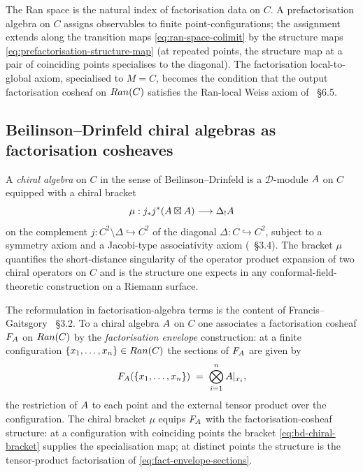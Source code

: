 The Ran space is the natural index of factorisation data on $C$. A
prefactorisation algebra on $C$ assigns observables to finite
point-configurations; the assignment extends along the transition maps
\eqref{eq:ran-space-colimit} by the structure maps
\eqref{eq:prefactorisation-structure-map} (at repeated points, the
structure map at a pair of coinciding points specialises to the
diagonal). The factorisation local-to-global axiom, specialised to
$M = C$, becomes the condition that the output factorisation cosheaf
on $Ran(C)$ satisfies the Ran-local Weiss axiom of
\cite{CostelloGwilliam2017}~\S6.5.

\subsection{Beilinson--Drinfeld chiral algebras as factorisation cosheaves}

A \emph{chiral algebra} on $C$ in the sense of Beilinson--Drinfeld
\cite{BeilinsonDrinfeld} is a $\mathcal{D}$-module $A$ on $C$
equipped with a chiral bracket
\begin{equation}
\label{eq:bd-chiral-bracket}
  \mu : j_* j^{*} (A \boxtimes A) \longrightarrow
  \Delta_{!} A
\end{equation}
on the complement $j \colon C^2 \setminus \Delta \hookrightarrow C^2$
of the diagonal $\Delta \colon C \hookrightarrow C^2$, subject to a
symmetry axiom and a Jacobi-type associativity axiom
(\cite{BeilinsonDrinfeld}~\S3.4). The bracket $\mu$ quantifies the
short-distance singularity of the operator product expansion of two
chiral operators on $C$ and is the structure one expects in any
conformal-field-theoretic construction on a Riemann surface.

The reformulation in factorisation-algebra terms is the content of
Francis--Gaitsgory \cite{FrancisGaitsgory2012}~\S3.2. To a chiral
algebra $A$ on $C$ one associates a factorisation cosheaf
$F_{A}$ on $Ran(C)$ by the \emph{factorisation envelope}
construction: at a finite configuration $\{x_1, \dots, x_n\} \in
Ran(C)$ the sections of $F_{A}$ are given by
\begin{equation}
\label{eq:fact-envelope-sections}
  F_{A}(\{x_1, \dots, x_n\}) \;=\; \bigotimes_{i = 1}^{n} A|_{x_i},
\end{equation}
the restriction of $A$ to each point and the external tensor product
over the configuration. The chiral bracket $\mu$ equips $F_{A}$
with the factorisation-cosheaf structure: at a configuration with
coinciding points the bracket \eqref{eq:bd-chiral-bracket} supplies
the specialisation map; at distinct points the structure is the
tensor-product factorisation of \eqref{eq:fact-envelope-sections}.

